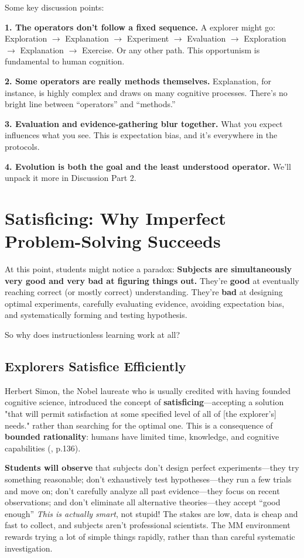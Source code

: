 \documentclass[12pt,letterpaper]{article}
\begin{document}
Some key discussion points:

\textbf{1. The operators don't follow a fixed sequence.} A explorer might go: Exploration $\rightarrow$ Explanation $\rightarrow$ Experiment $\rightarrow$ Evaluation $\rightarrow$ Exploration $\rightarrow$ Explanation $\rightarrow$ Exercise. Or any other path. This opportunism is fundamental to human cognition.

\textbf{2. Some operators are really methods themselves.} Explanation, for instance, is highly complex and draws on many cognitive processes. There's no bright line between ``operators'' and ``methods.''

\textbf{3. Evaluation and evidence-gathering blur together.} What you expect influences what you see. This is expectation bias, and it's everywhere in the protocols.

\textbf{4. Evolution is both the goal and the least understood operator.} We'll unpack it more in Discussion Part 2.

\section{Satisficing: Why Imperfect Problem-Solving Succeeds}

At this point, students might notice a paradox: \textbf{Subjects are simultaneously very good and very bad at figuring things out.} They're \textbf{good} at eventually reaching correct (or mostly correct) understanding. They're \textbf{bad} at designing optimal experiments, carefully evaluating evidence, avoiding expectation bias, and systematically forming and testing hypothesis.

So why does instructionless learning work at all?

\subsection{Explorers Satisfice Efficiently}

Herbert Simon, the Nobel laureate who is usually credited with having founded cognitive science, introduced the concept of \textbf{satisficing}—accepting a solution "that will permit satisfaction at some specified level of all of [the explorer's] needs." rather than searching for the optimal one. This is a consequence of \textbf{bounded rationality}: humans have limited time, knowledge, and cognitive capabilities (\cite{Simon1956}, p.136).

\textbf{Students will observe} that subjects don't design perfect experiments—they try something reasonable; don't exhaustively test hypotheses—they run a few trials and move on; don't carefully analyze all past evidence—they focus on recent observations; and don't eliminate all alternative theories—they accept ``good enough'' \textit{This is actually smart}, not stupid! The stakes are low, data is cheap and fast to collect, and subjects aren't professional scientists. The MM environment rewards trying a lot of simple things rapidly, rather than than careful systematic investigation.
\end{document}
